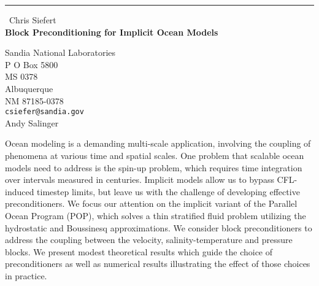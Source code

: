 \documentclass{report}
\begin{document}
\begin{center}
\rule{6in}{1pt} \
{\large Chris Siefert \\
{\bf Block Preconditioning for Implicit Ocean Models}}

Sandia National Laboratories \\ P O Box 5800 \\ MS 0378 \\ Albuquerque \\ NM 87185-0378
\\
{\tt csiefer@sandia.gov}\\
Andy Salinger\end{center}

Ocean modeling is a demanding multi-scale application, involving the
coupling of phenomena at various time and spatial scales. One
problem that scalable ocean models need to address is the spin-up
problem, which requires time integration over intervals measured in
centuries. Implicit models allow us to bypass CFL-induced timestep
limits, but leave us with the challenge of developing effective
preconditioners. We focus our attention on the implicit variant of the
Parallel Ocean Program (POP), which solves a thin stratified fluid
problem utilizing the hydrostatic and Boussinesq approximations. We
consider block preconditioners to address the coupling between the
velocity, salinity-temperature and pressure blocks. We present modest
theoretical results which guide the choice of preconditioners as well as
numerical results illustrating the effect of those choices in practice.
\end{document}

